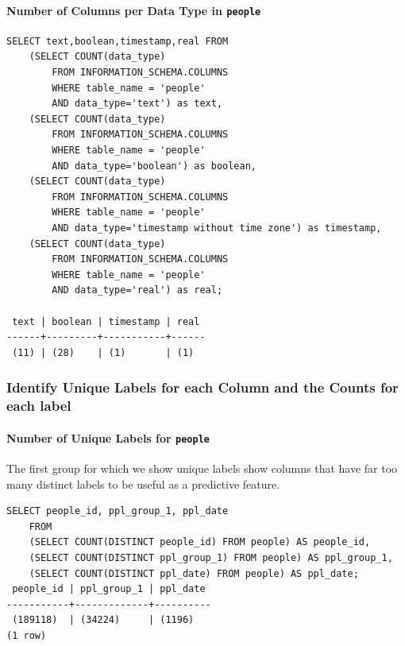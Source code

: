 \documentclass[]{report}
\begin{document}
\paragraph{Number of Columns per Data Type in
\texttt{people}}\label{number-of-columns-per-data-type-in-people}

\begin{verbatim}
SELECT text,boolean,timestamp,real FROM 
    (SELECT COUNT(data_type) 
        FROM INFORMATION_SCHEMA.COLUMNS 
        WHERE table_name = 'people' 
        AND data_type='text') as text,
    (SELECT COUNT(data_type) 
        FROM INFORMATION_SCHEMA.COLUMNS 
        WHERE table_name = 'people' 
        AND data_type='boolean') as boolean,
    (SELECT COUNT(data_type) 
        FROM INFORMATION_SCHEMA.COLUMNS 
        WHERE table_name = 'people' 
        AND data_type='timestamp without time zone') as timestamp,
    (SELECT COUNT(data_type) 
        FROM INFORMATION_SCHEMA.COLUMNS 
        WHERE table_name = 'people' 
        AND data_type='real') as real;

 text | boolean | timestamp | real
------+---------+-----------+------
 (11) | (28)    | (1)       | (1)
\end{verbatim}

\subsubsection{Identify Unique Labels for each Column and the Counts for
each
label}\label{identify-unique-labels-for-each-column-and-the-counts-for-each-label}

\paragraph{Number of Unique Labels for
\texttt{people}}\label{number-of-unique-labels-for-people}

The first group for which we show unique labels show columns that have
far too many distinct labels to be useful as a predictive feature.

\begin{verbatim}
SELECT people_id, ppl_group_1, ppl_date
    FROM
    (SELECT COUNT(DISTINCT people_id) FROM people) AS people_id,
    (SELECT COUNT(DISTINCT ppl_group_1) FROM people) AS ppl_group_1,
    (SELECT COUNT(DISTINCT ppl_date) FROM people) AS ppl_date;
 people_id | ppl_group_1 | ppl_date
-----------+-------------+----------
 (189118)  | (34224)     | (1196)
(1 row)
\end{verbatim}
\end{document}
